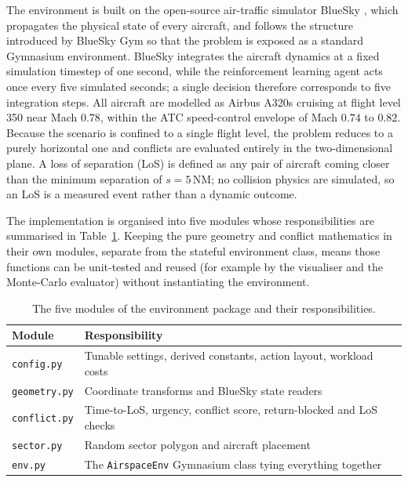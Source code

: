 The environment is built on the open-source air-traffic simulator BlueSky \cite{hoekstra2016}, which propagates the physical state of every aircraft, and follows the structure introduced by BlueSky Gym \cite{groot2024} so that the problem is exposed as a standard Gymnasium environment. BlueSky integrates the aircraft dynamics at a fixed simulation timestep of one second, while the reinforcement learning agent acts once every five simulated seconds; a single decision therefore corresponds to five integration steps. All aircraft are modelled as Airbus A320s cruising at flight level 350 near Mach $0.78$, within the ATC speed-control envelope of Mach $0.74$ to $0.82$. Because the scenario is confined to a single flight level, the problem reduces to a purely horizontal one and conflicts are evaluated entirely in the two-dimensional plane. A loss of separation (LoS) is defined as any pair of aircraft coming closer than the minimum separation of $s = 5$\,NM; no collision physics are simulated, so an LoS is a measured event rather than a dynamic outcome.

The implementation is organised into five modules whose responsibilities are summarised in Table~\ref{tab:modules}. Keeping the pure geometry and conflict mathematics in their own modules, separate from the stateful environment class, means those functions can be unit-tested and reused (for example by the visualiser and the Monte-Carlo evaluator) without instantiating the environment.

\begin{table}[htbp]
\centering
\caption{The five modules of the environment package and their responsibilities.}
\label{tab:modules}
\begin{tabular}{ll}
\toprule
Module & Responsibility \\
\midrule
\texttt{config.py}   & Tunable settings, derived constants, action layout, workload costs \\
\texttt{geometry.py} & Coordinate transforms and BlueSky state readers \\
\texttt{conflict.py} & Time-to-LoS, urgency, conflict score, return-blocked and LoS checks \\
\texttt{sector.py}   & Random sector polygon and aircraft placement \\
\texttt{env.py}      & The \texttt{AirspaceEnv} Gymnasium class tying everything together \\
\bottomrule
\end{tabular}
\end{table}


